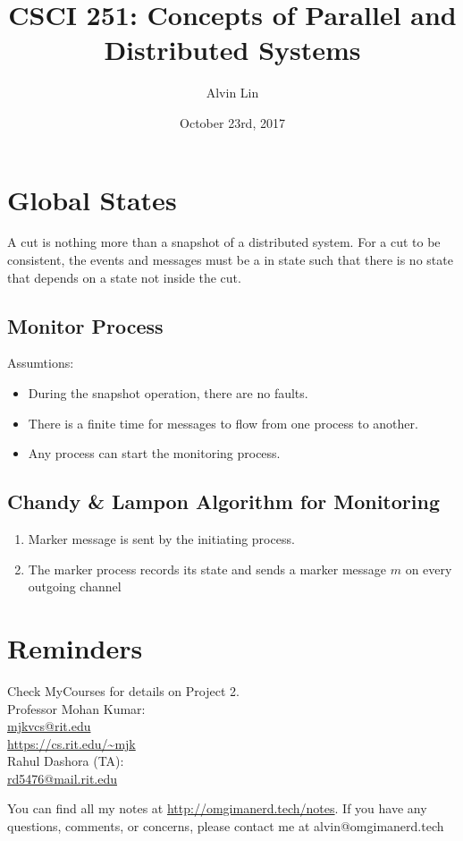 \documentclass{math}
\title{CSCI 251: Concepts of Parallel and Distributed Systems}
\author{Alvin Lin}
\date{October 23rd, 2017}
\begin{document}
\maketitle

\section*{Global States}
A cut is nothing more than a snapshot of a distributed system. For a cut to be
consistent, the events and messages must be a in state such that there is no
state that depends on a state not inside the cut.

\subsection*{Monitor Process}
Assumtions:
\begin{itemize}
  \item During the snapshot operation, there are no faults.
  \item There is a finite time for messages to flow from one process to another.
  \item Any process can start the monitoring process.
\end{itemize}

\subsection*{Chandy \& Lampon Algorithm for Monitoring}
\begin{enumerate}
  \item Marker message is sent by the initiating process.
  \item The marker process records its state and sends a marker message
  \( m \) on every outgoing channel
\end{enumerate}

\section*{Reminders}
Check MyCourses for details on Project 2. \\
\noindent Professor Mohan Kumar: \\
\url{mjkvcs@rit.edu} \\
\url{https://cs.rit.edu/~mjk} \\

\noindent Rahul Dashora (TA): \\
\url{rd5476@mail.rit.edu} \\

\begin{center}
  You can find all my notes at \url{http://omgimanerd.tech/notes}. If you have
  any questions, comments, or concerns, please contact me at
  alvin@omgimanerd.tech
\end{center}
\end{document}
